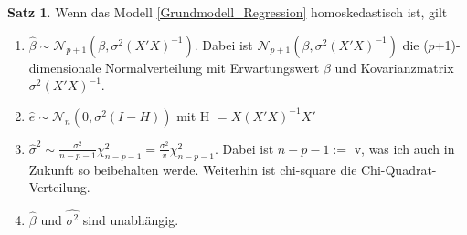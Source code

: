 \documentclass[12pt,a4paper]{article}
\theoremstyle{definition}
\theoremstyle{definition}
\newtheorem{Satz}[Definition]{Satz}
\theoremstyle{definition}
\begin{document}
\begin{Satz} \label{Basiseigenschaften}
Wenn das Modell \eqref{Grundmodell_Regression} homoskedastisch ist, gilt
\begin{enumerate}
\item $\hat{\beta} \sim \mathscr{N}_{p+1}(\beta,\sigma^2(X'X)^{-1})$. Dabei ist $\mathscr{N}_{p+1}(\beta,\sigma^2(X'X)^{-1})$ die ($p$+1)-dimensionale Normalverteilung mit Erwartungswert $\beta$ und Kovarianzmatrix $\sigma^2 (X'X)^{-1}$.
\item $\hat{e} \sim \mathscr{N}_n(0,\sigma^2(I-H)) $ mit  \gls{H} $=X(X'X)^{-1}X' $
\item $\hat{\sigma}^2 \sim \frac{\sigma^2}{n-p-1}\chi_{n-p-1}^2 = \frac{\sigma^2}{v}\chi^2_{n-p-1}$. Dabei ist $n-p-1 :=$ \gls{v}, was ich auch in Zukunft so beibehalten werde. Weiterhin ist \gls{chi-square} die Chi-Quadrat-Verteilung.
\item $\hat{\beta}$ und $\widehat{\sigma^2}$ sind unabhängig.
\end{enumerate}
\end{Satz}
\end{document}
